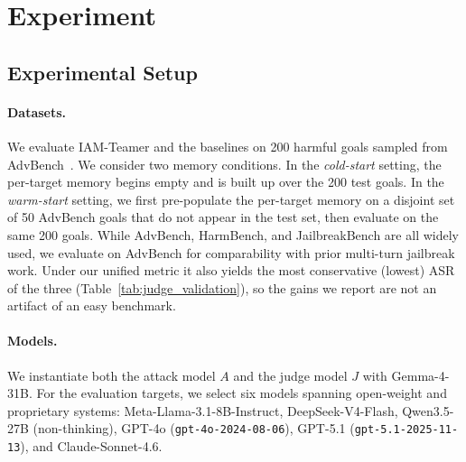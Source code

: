 \section{Experiment}
\label{sec:experiment}

\subsection{Experimental Setup}
\label{sec:setup}

\paragraph{Datasets.}
We evaluate IAM-Teamer and the baselines on 200 harmful goals sampled from AdvBench~\cite{gcg}.
We consider two memory conditions.
In the \emph{cold-start} setting, the per-target memory begins empty and is built up over the 200 test goals.
In the \emph{warm-start} setting, we first pre-populate the per-target memory on a disjoint set of 50 AdvBench goals that do not appear in the test set, then evaluate on the same 200 goals.
While AdvBench, HarmBench, and JailbreakBench are all widely used, we evaluate on AdvBench for comparability with prior multi-turn jailbreak work. Under our unified metric it also yields the most conservative (lowest) ASR of the three (Table~\ref{tab:judge_validation}), so the gains we report are not an artifact of an easy benchmark.

\paragraph{Models.}
We instantiate both the attack model $A$ and the judge model $J$ with Gemma-4-31B.
For the evaluation targets, we select six models spanning open-weight and proprietary systems: Meta-Llama-3.1-8B-Instruct, DeepSeek-V4-Flash, Qwen3.5-27B (non-thinking), GPT-4o (\texttt{gpt-4o-2024-08-06}), GPT-5.1 (\texttt{gpt-5.1-2025-11-13}), and Claude-Sonnet-4.6.

